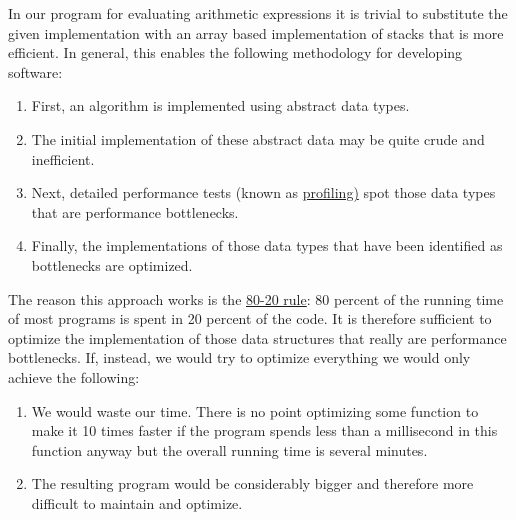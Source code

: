 \begin{enumerate}
       In our program for evaluating  arithmetic expressions it is trivial to substitute the given
       implementation with an array based implementation of stacks that is more efficient.  In general,
       this enables the following methodology for developing software:  
       \begin{enumerate}
       \item First, an algorithm is implemented using abstract data types.
       \item The initial implementation of these abstract data may be quite crude and inefficient.
       \item Next, detailed performance tests (known as 
             \href{http://en.wikipedia.org/wiki/Profiling_(computer_programming)}{profiling)}
             spot those data types that are performance bottlenecks.
       \item Finally, the implementations of those data types that have been identified as bottlenecks are optimized.
       \end{enumerate}
       The reason this approach works is the 
       \href{http://en.wikipedia.org/wiki/Pareto_principle#In_software}{80-20 rule}:  
       80 percent of the running time of most programs is spent in 20 percent of the code.  It is
       therefore sufficient to optimize the 
       implementation of those data structures that really are performance bottlenecks.  If,
       instead, we would try to optimize everything we would only achieve the following:
       \begin{enumerate}
       \item We would waste our time.  There is no point optimizing some function to make it 10 times
             faster if the program spends less than a millisecond in this function anyway but the
             overall running time is several minutes.
       \item The resulting program would be considerably bigger and therefore more difficult to 
             maintain and optimize.
       \end{enumerate}
 \end{enumerate}





